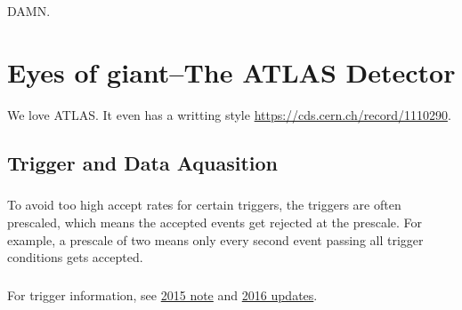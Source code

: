 \begin{savequote}[75mm]
DAMN.
\end{savequote}

\chapter{Eyes of giant--The ATLAS Detector}

We love ATLAS. It even has a writting style \href{guide}{https://cds.cern.ch/record/1110290}.

\section{Trigger and Data Aquasition}
\paragraph{}
To avoid too high accept rates for certain triggers, the triggers are often prescaled, which means the accepted events get rejected at the prescale. For example, a prescale of two means only every second event passing all trigger conditions gets accepted. 

\paragraph{}
For trigger information, see \href{http://atlas.web.cern.ch/Atlas/GROUPS/PHYSICS/PAPERS/TRIG-2016-01/}{2015 note} and \href{https://cds.cern.ch/record/2242069/files/ATL-DAQ-PUB-2017-001.pdf}{2016 updates}.